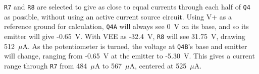 \begin{multicols}{2}
\texttt{R7} and \texttt{R8} are selected to give as close to equal currents
through each half of \texttt{Q4} as possible, without using an active current
source circuit. Using V+ as a reference ground for calculation, \texttt{Q4A}
will always see 0~V on its base, and so its emitter will give -0.65~V.
With VEE as -32.4~V, \texttt{R8} will see 31.75~V, drawing 512~$\mu$A.
As the potentiometer is turned, the voltage at \texttt{Q4B}'s base and emitter
will change, ranging from -0.65~V at the emitter to -5.30~V. This gives a
current range through \texttt{R7} from 484~$\mu$A to 567~$\mu$A, centered
at  525~$\mu$A.

\end{multicols}

